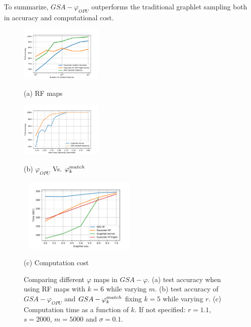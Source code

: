 \documentclass{article}
\begin{document}
To summarize, $GSA-\varphi_{OPU}$ outperforms the traditional graphlet sampling both in accuracy and computational cost.

\begin{figure}[htb]


%
\begin{minipage}[b]{.48\linewidth}
  \centering
  \centerline{\includegraphics[width=4.0cm]{figs/phi_comparison(1).pdf}}
  \centerline{(a) RF maps}\medskip
  \label{subfig:RF_maps}
\end{minipage}
\hfill
\begin{minipage}[b]{0.48\linewidth}
  \centering
  \centerline{\includegraphics[width=4.0cm]{figs/gk_vs_opu.pdf}}
  \centerline{(b) $\varphi_{OPU}$ Vs. $\varphi^{match}_k$}\medskip
\end{minipage}
%
\begin{minipage}[b]{1.0\linewidth}
  \centering
  \centerline{\includegraphics[width=6cm,height=3.6cm]{figs/computational_comp.pdf}}
  \centerline{(c) Computation cost}\medskip
\end{minipage}
\caption{Comparing different $\varphi$ maps in $GSA-\varphi$. (a) test accuracy when using RF maps with $k=6$ while varying $m$. (b) test accuracy of $GSA-\varphi_{OPU}$ and $GSA-\varphi^{match}_k$  fixing $k=5$ while varying $r$. (c) Computation time as a function of $k$. If not specified:  $r=1.1$, $s=2000$, $m=5000$ and $\sigma=0.1$.}
\label{fig:diff_phi}
%
\end{figure}
\end{document}
